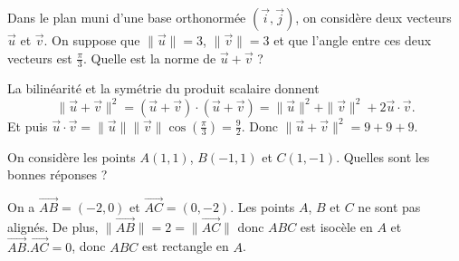 \begin{question}

Dans le plan muni d'une base orthonormée $(\vec{i},\vec{j})$, on considère deux vecteurs $\displaystyle \vec{u}$ et $\displaystyle \vec{v}$. On suppose que $\|\vec{u}\|=3$, $\|\vec{v}\|=3$ et que l'angle entre ces deux vecteurs est $\displaystyle \frac{\pi}{3}$. Quelle est la norme de $\vec{u}+\vec{v}$ ?
\begin{answers}  
\end{answers}
\begin{explanations}
La bilinéarité et la symétrie du produit scalaire donnent
$$\|\vec{u}+\vec{v}\|^2=(\vec{u}+\vec{v})\cdot(\vec{u}+\vec{v})=\|\vec{u}\|^2+\|\vec{v}\|^2+2\vec{u}\cdot\vec{v}.$$
Et puis $\displaystyle \vec{u}\cdot \vec{v}=\|\vec{u}\|\|\vec{v}\|\cos \left(\frac{\pi}{3}\right)=\frac{9}{2}$. Donc $\|\vec{u}+\vec{v}\|^2=9+9+9$.
\end{explanations}
\end{question}


\begin{question}

On considère les points $A(1,1)$, $B(-1,1)$ et $C(1,-1)$. Quelles sont les bonnes réponses ?
\begin{answers}  
\end{answers}
\begin{explanations}
On a $\overrightarrow{AB}=(-2,0)$ et $\overrightarrow{AC}=(0,-2)$. Les points $A$, $B$ et $C$ ne sont pas alignés. De plus, $\|\overrightarrow{AB}\|=2=\|\overrightarrow{AC}\|$ donc $ABC$ est isocèle en $A$ et $\overrightarrow{AB}.\overrightarrow{AC}=0$, donc $ABC$ est rectangle en $A$.
\end{explanations}
\end{question}



